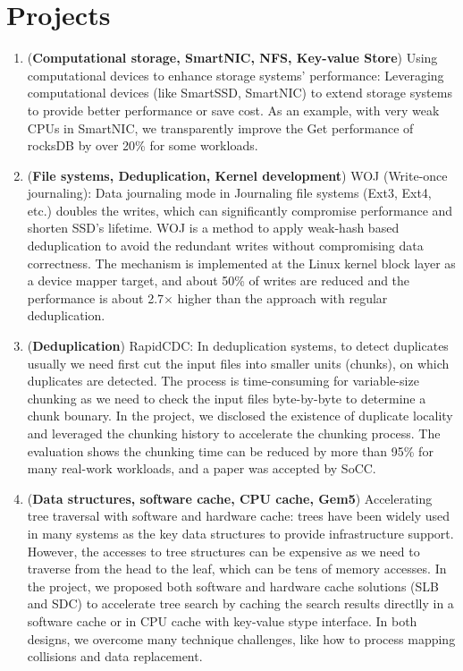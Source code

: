 \documentclass{article}
\begin{document}
\section{Projects}
\begin{enumerate}
\item (\textbf{Computational storage, SmartNIC, NFS, Key-value Store}) Using computational devices to enhance storage systems' performance: Leveraging computational devices (like SmartSSD, SmartNIC) to extend storage systems to provide better performance or save cost. As an example, with very weak CPUs in SmartNIC, we transparently improve the Get performance of rocksDB by over 20\% for some workloads.
\item (\textbf{File systems, Deduplication, Kernel development}) WOJ (Write-once journaling): Data journaling mode in Journaling file systems (Ext3, Ext4, etc.) doubles the writes, which can significantly compromise performance and shorten SSD's lifetime. WOJ is a method to apply weak-hash based deduplication to avoid the redundant writes without compromising data correctness. The mechanism is implemented at the Linux kernel block layer as a device mapper target, and about 50\% of writes are reduced and the performance is about 2.7$\times$ higher than the approach with regular deduplication. 
\item (\textbf{Deduplication}) RapidCDC:  In deduplication systems, to detect duplicates usually we need first cut the input files into smaller units (chunks), on which duplicates are detected. The process is time-consuming for variable-size chunking as we need to check the input files byte-by-byte to determine a chunk bounary. In the project, we disclosed the existence of duplicate locality and leveraged the chunking history to accelerate the chunking process. The evaluation shows the chunking time can be reduced by more than 95\% for many real-work workloads, and a paper was accepted by SoCC.
\item (\textbf{Data structures, software cache, CPU cache, Gem5}) Accelerating tree traversal with software and hardware cache: trees have been widely used in many systems as the key data structures to provide infrastructure support. However, the accesses to tree structures can be expensive as we need to traverse from the head to the leaf, which can be tens of memory accesses. In the project, we proposed both software and hardware cache solutions (SLB and SDC) to accelerate tree search by caching the search results directlly in a software cache or in CPU cache with key-value stype interface. In both designs, we overcome many technique challenges, like how to process mapping collisions and data replacement.

\end{enumerate}
\end{document}
